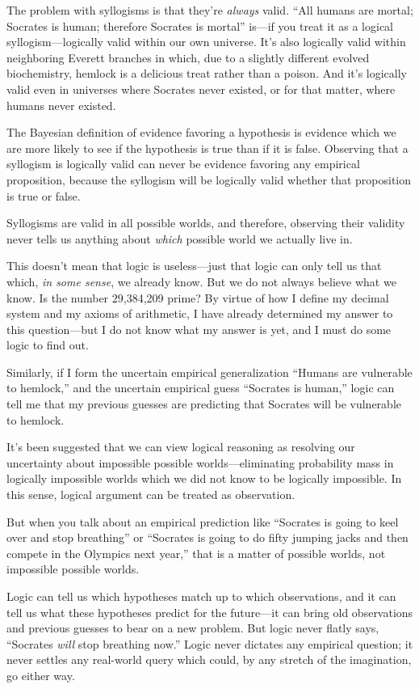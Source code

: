{
 The problem with syllogisms is that they're
\textit{always} valid. ``All humans are mortal;
Socrates is human; therefore Socrates is mortal''
is---if you treat it as a logical syllogism---logically valid within
our own universe. It's also logically valid within
neighboring Everett branches in which, due to a slightly different
evolved biochemistry, hemlock is a delicious treat rather than a
poison. And it's logically valid even in universes
where Socrates never existed, or for that matter, where humans never
existed.}

{
 The Bayesian definition of evidence favoring a hypothesis is
evidence which we are more likely to see if the hypothesis is true than
if it is false. Observing that a syllogism is logically valid can never
be evidence favoring any empirical proposition, because the syllogism
will be logically valid whether that proposition is true or false.}

{
 Syllogisms are valid in all possible worlds, and therefore,
observing their validity never tells us anything about \textit{which}
possible world we actually live in.}

{
 This doesn't mean that logic is useless---just
that logic can only tell us that which, \textit{in some sense}, we
already know. But we do not always believe what we know. Is the number
29,384,209 prime? By virtue of how I define my decimal system and my
axioms of arithmetic, I have already determined my answer to this
question---but I do not know what my answer is yet, and I must do some
logic to find out.}

{
 Similarly, if I form the uncertain empirical generalization
``Humans are vulnerable to
hemlock,'' and the uncertain empirical guess
``Socrates is human,'' logic can
tell me that my previous guesses are predicting that Socrates will be
vulnerable to hemlock.}

{
 It's been suggested that we can view logical
reasoning as resolving our uncertainty about impossible possible
worlds---eliminating probability mass in logically impossible worlds
which we did not know to be logically impossible. In this sense,
logical argument can be treated as observation.}

{
 But when you talk about an empirical prediction like
``Socrates is going to keel over and stop
breathing'' or ``Socrates is going
to do fifty jumping jacks and then compete in the Olympics next
year,'' that is a matter of possible worlds, not
impossible possible worlds.}

{
 Logic can tell us which hypotheses match up to which observations,
and it can tell us what these hypotheses predict for the future---it
can bring old observations and previous guesses to bear on a new
problem. But logic never flatly says, ``Socrates
\textit{will} stop breathing now.'' Logic never
dictates any empirical question; it never settles any real-world query
which could, by any stretch of the imagination, go either way.}

